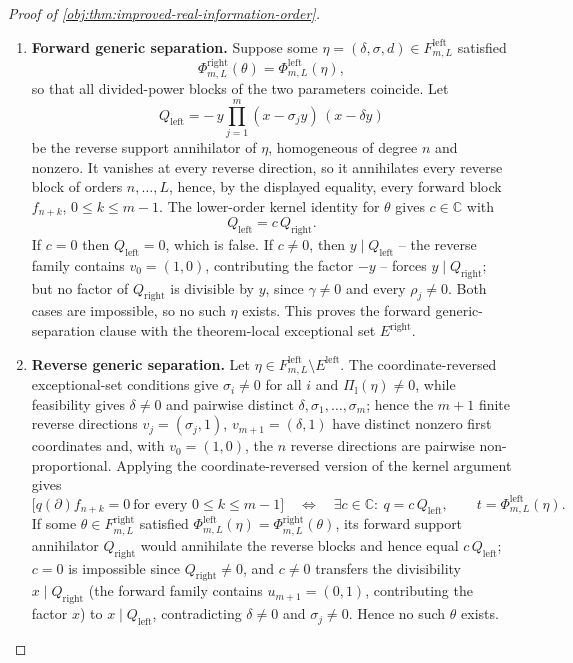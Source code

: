 \begin{proof}[Proof of \cref{obj:thm:improved-real-information-order}]
\begin{enumerate}
\item \textbf{Forward generic separation.}  Suppose some \(\eta=(\delta,\sigma,d)\in F^{\mathrm{left}}_{m,L}\) satisfied
\[
\Phi^{\mathrm{right}}_{m,L}(\theta)=\Phi^{\mathrm{left}}_{m,L}(\eta),
\]
so that all divided-power blocks of the two parameters coincide.  Let
\[
Q_{\mathrm{left}}=-\,y\prod_{j=1}^{m}(x-\sigma_jy)\,(x-\delta y)
\]
be the reverse support annihilator of \(\eta\), homogeneous of degree \(n\) and nonzero.  It vanishes at every reverse direction, so it annihilates every reverse block of orders \(n,\ldots,L\), hence, by the displayed equality, every forward block \(f_{n+k}\), \(0\le k\le m-1\).  The lower-order kernel identity for \(\theta\) gives \(c\in\mathbb C\) with
\[
Q_{\mathrm{left}}=c\,Q_{\mathrm{right}} .
\]
If \(c=0\) then \(Q_{\mathrm{left}}=0\), which is false.  If \(c\ne0\), then \(y\mid Q_{\mathrm{left}}\) -- the reverse family contains \(v_0=(1,0)\), contributing the factor \(-y\) -- forces \(y\mid Q_{\mathrm{right}}\); but no factor of \(Q_{\mathrm{right}}\) is divisible by \(y\), since \(\gamma\ne0\) and every \(\rho_j\ne0\).  Both cases are impossible, so no such \(\eta\) exists.  This proves the forward generic-separation clause with the theorem-local exceptional set \(E^{\mathrm{right}}\).

\item \textbf{Reverse generic separation.}  Let \(\eta\in F^{\mathrm{left}}_{m,L}\setminus E^{\mathrm{left}}\).  The coordinate-reversed exceptional-set conditions give \(\sigma_i\ne0\) for all \(i\) and \(\Pi_{\mathrm l}(\eta)\ne0\), while feasibility gives \(\delta\ne0\) and pairwise distinct \(\delta,\sigma_1,\ldots,\sigma_m\); hence the \(m+1\) finite reverse directions \(v_j=(\sigma_j,1)\), \(v_{m+1}=(\delta,1)\) have distinct nonzero first coordinates and, with \(v_0=(1,0)\), the \(n\) reverse directions are pairwise non-proportional.  Applying the coordinate-reversed version of the kernel argument gives
\[
\bigl[q(\partial)f_{n+k}=0\ \text{for every }0\le k\le m-1\bigr]
\quad\Longleftrightarrow\quad
\exists c\in\mathbb C:\ q=c\,Q_{\mathrm{left}},
\qquad t=\Phi^{\mathrm{left}}_{m,L}(\eta).
\]
If some \(\theta\in F^{\mathrm{right}}_{m,L}\) satisfied \(\Phi^{\mathrm{left}}_{m,L}(\eta)=\Phi^{\mathrm{right}}_{m,L}(\theta)\), its forward support annihilator \(Q_{\mathrm{right}}\) would annihilate the reverse blocks and hence equal \(c\,Q_{\mathrm{left}}\); \(c=0\) is impossible since \(Q_{\mathrm{right}}\ne0\), and \(c\ne0\) transfers the divisibility \(x\mid Q_{\mathrm{right}}\) (the forward family contains \(u_{m+1}=(0,1)\), contributing the factor \(x\)) to \(x\mid Q_{\mathrm{left}}\), contradicting \(\delta\ne0\) and \(\sigma_j\ne0\).  Hence no such \(\theta\) exists.


\end{enumerate}
\end{proof}
